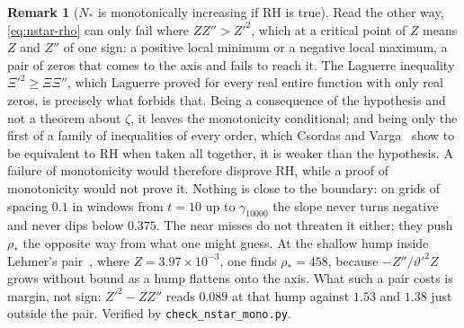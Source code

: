 \documentclass[11pt]{article}
\theoremstyle{definition}
\newtheorem{remark}[theorem]{Remark}
\begin{document}
\begin{remark}[$N_{\ast}$ is monotonically increasing if RH is true]
Read the other way, \eqref{eq:nstar-rho} can only fail where $ZZ''>Z'^2$, which
at a critical point of $Z$ means $Z$ and $Z''$ of one sign: a positive local
minimum or a negative local maximum, a pair of zeros that comes to the axis and
fails to reach it. The Laguerre inequality $\Xi'^2\geq\Xi\Xi''$, which Laguerre
proved for every real entire function with only real zeros, is precisely what
forbids that. Being a consequence of the hypothesis and not a theorem about
$\zeta$, it leaves the monotonicity conditional; and being only the first of a
family of inequalities of every order, which Csordas and
Varga~\cite{CsordasVarga1990} show to be equivalent to RH when taken all
together, it is weaker than the hypothesis. A failure of monotonicity would
therefore disprove RH, while a proof of monotonicity would not prove it. Nothing
is close to the boundary: on grids of spacing $0.1$ in windows from $t=10$ up to
$\gamma_{10000}$ the slope never turns negative and never dips below $0.375$.
The near misses do not threaten it either; they push $\rho_{\ast}$ the opposite
way from what one might guess. At the shallow hump inside Lehmer's
pair~\cite{Lehmer1956}, where $Z=3.97\times10^{-3}$, one finds
$\rho_{\ast}=458$, because $-Z''/\vartheta'^2Z$ grows without bound as a hump
flattens onto the axis. What such a pair costs is margin, not sign:
$Z'^2-ZZ''$ reads $0.089$ at that hump against $1.53$ and $1.38$ just outside
the pair. Verified by \texttt{check\_nstar\_mono.py}.
\end{remark}
\end{document}
